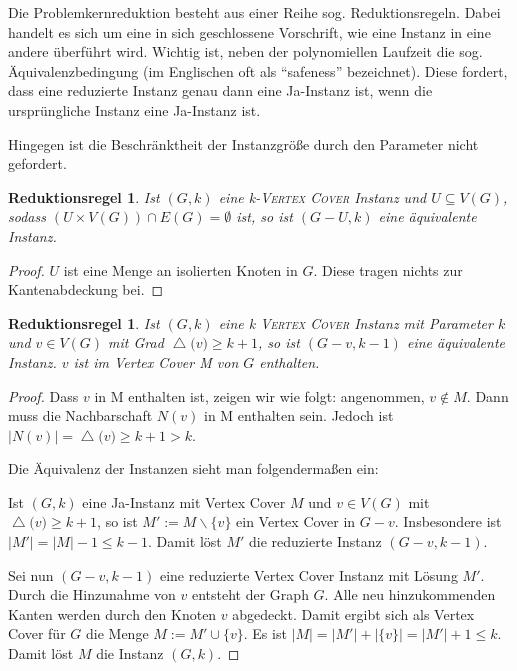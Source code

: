 \documentclass[a4paper,ngerman]{atseminar}
\renewcommand{\deg}[1]{\ensuremath{\operatorname{\triangle}\bigl(#1\bigr)}\xspace}
\newtheorem{reductionrule}[theorem]{\textbf{Reduktionsregel}}
\begin{document}
\begin{example}
    Die Problemkernreduktion besteht aus einer Reihe sog. Reduktionsregeln. Dabei handelt es sich um eine in sich geschlossene
    Vorschrift, wie eine Instanz in eine andere überführt wird.
    Wichtig ist, neben der polynomiellen Laufzeit die sog. Äquivalenzbedingung (im Englischen oft als \enquote{safeness} bezeichnet).
    Diese fordert, dass eine reduzierte Instanz genau dann eine Ja-Instanz ist, wenn die ursprüngliche Instanz eine Ja-Instanz ist.

    \noindent
    Hingegen ist die Beschränktheit der Instanzgröße durch den Parameter nicht gefordert.

    \begin{reductionrule}
      \label{OE:reduction:1}
      Ist $(G, k)$ eine k-\textsc{Vertex Cover} Instanz und $U \subseteq V(G)$, sodass $ (U \times V(G)) \cap E(G) = \emptyset $ ist, so ist $(G - U, k)$
      eine äquivalente Instanz.
    \end{reductionrule}
    \begin{proof}
      $U$ ist eine Menge an isolierten Knoten in $G$. Diese tragen nichts zur Kantenabdeckung bei.
    \end{proof}

    \begin{reductionrule}
      \label{OE:reduction:2}
      Ist $(G, k)$ eine k \textsc{Vertex Cover} Instanz mit Parameter $k$ und $v \in V(G)$ mit Grad $\deg{v} \geq k + 1$,
      so ist $(G - v, k - 1)$ eine äquivalente Instanz. $v$ ist im Vertex Cover M von $G$ enthalten.
    \end{reductionrule}
    \begin{proof}
      Dass $v$ in M enthalten ist, zeigen wir wie folgt:
      angenommen, $v \notin M$. Dann muss die Nachbarschaft $N(v)$ in M enthalten sein. Jedoch ist $|N(v)| = \deg{v} \geq k + 1 > k$.


      \noindent
      Die Äquivalenz der Instanzen sieht man folgendermaßen ein:

      \noindent
      Ist $(G, k)$ eine Ja-Instanz mit Vertex Cover $M$ und $v \in V(G)$ mit $\deg{v} \geq k + 1$, so ist $M' := M \backslash \{v\}$ ein Vertex Cover in $G - v$.
      Insbesondere ist $|M'| = |M| - 1 \leq k -1$.
      Damit löst $M'$ die reduzierte Instanz $(G - v, k - 1)$.

      \noindent
      Sei nun $(G - v, k - 1)$ eine reduzierte Vertex Cover Instanz mit Lösung $M'$. Durch die Hinzunahme von $v$ entsteht der Graph $G$.
      Alle neu hinzukommenden Kanten werden durch den Knoten $v$ abgedeckt.
      Damit ergibt sich als Vertex Cover für $G$ die Menge $M := M' \cup \{v\}$.
      Es ist $|M| = |M'| + |\{v\}| = |M'| + 1 \leq k$. Damit löst $M$ die Instanz $(G, k)$.
    \end{proof}


\end{example}
\end{document}
